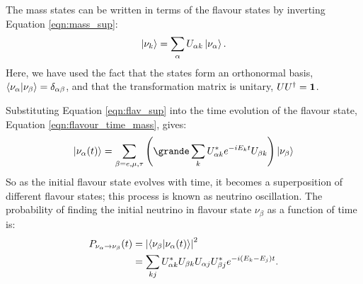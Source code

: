 The mass states can be written in terms of the flavour states by inverting
Equation \ref{eqn:mass_sup}:
\begin{equation}
	\label{eqn:flav_sup}
	\ket{\nu_k} = \sum_\alpha U_{\alpha k} \ket{\nu_\alpha}.
\end{equation}
Here, we have used the fact that the states form an orthonormal basis,
\(\braket{\nu_\alpha}{\nu_\beta} = \delta_{\alpha \beta}\), and that the 
transformation matrix is unitary, \(UU^\dagger = \vb{1}\).

Substituting Equation \ref{eqn:flav_sup} into the time evolution of the flavour
state, Equation \ref{eqn:flavour_time_mass}, gives:
\begin{equation}
	\label{eqn:flavour_time_flav}
	\ket{\nu_\alpha(t)} = \sum_{\beta = e, \mu, \tau} \qty(\grande \sum_k
	U^*_{\alpha k} e^{-iE_kt} U_{\beta k})\ket{\nu_\beta} 
\end{equation}
So as the initial flavour state evolves with time, it becomes a superposition 
of different flavour states; this process is known as neutrino oscillation.
The probability of finding the initial neutrino in flavour state \(\nu_\beta\) 
as a function of time is:
\begin{align}
	\label{eqn:p_osc_u}
	P_{\nu_\alpha \rightarrow \nu_\beta}(t) &= \abs{\braket{\nu_\beta}{\nu_\alpha(t)}}^2 \\
	                               &= \sum_{kj} U^*_{\alpha k} U_{\beta k} U_{\alpha j} U^*_{\beta j} e^{-i(E_k - E_j)t}.
\end{align}

